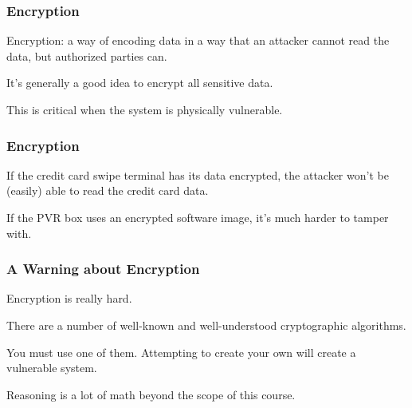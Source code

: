 \begin{frame}
\frametitle{Encryption}
\begin{changemargin}{1cm}

\alert{Encryption}: a way of encoding data in a way that an attacker cannot read the data, but authorized parties can. 

It's generally a good idea to encrypt all sensitive data.

This is critical when the system is physically vulnerable.

\end{changemargin}
\end{frame}


\begin{frame}
\frametitle{Encryption}
\begin{changemargin}{1cm}

If the credit card swipe terminal has its data encrypted, the attacker won't be (easily) able to read the credit card data.

If the PVR box uses an encrypted software image, it's much harder to tamper with. 

\end{changemargin}
\end{frame}

\begin{frame}
\frametitle{A Warning about Encryption}
\begin{changemargin}{1cm}

Encryption is really hard.

There are a number of well-known and well-understood cryptographic algorithms.

You must use one of them. Attempting to create your own will create a vulnerable system.

Reasoning is a lot of math beyond the scope of this course.

\end{changemargin}
\end{frame}


